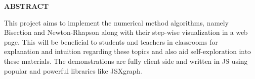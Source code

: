 



\begin{center}
	{\Large{\bf{ABSTRACT}}}\\
\end{center}

\noindent
This project aims to implement the numerical method algorithms, namely Bisection and Newton-Rhapson along with their step-wise visualization in a web page. This will be beneficial to students and teachers in classrooms for explanation and intuition regarding these topics and also aid self-exploration into these materials. The demonstrations are fully client side and written in JS using popular and powerful libraries like JSXgraph.
